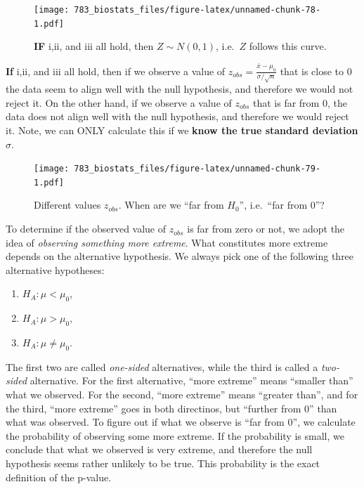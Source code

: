 \documentclass[]{book}
\providecommand{\tightlist}{%
  \setlength{\itemsep}{0pt}\setlength{\parskip}{0pt}}
\theoremstyle{definition}
\theoremstyle{definition}
\theoremstyle{definition}
\theoremstyle{remark}
\begin{document}
\begin{figure}
\centering
\texttt{[image: 783\_biostats\_files/figure-latex/unnamed-chunk-78-1.pdf]}
\caption{\label{fig:unnamed-chunk-78}\textbf{IF} i,ii, and iii all hold, then \(Z \sim N(0,1)\), i.e.~\(Z\) follows this curve.}
\end{figure}

\textbf{If} i,ii, and iii all hold, then if we observe a value of \(z_{obs} = \frac{\bar{x} - \mu_0}{\sigma/\sqrt{n}}\) that is close to \(0\) the data seem to align well with the null hypothesis, and therefore we would not reject it. On the other hand, if we observe a value of \(z_{obs}\) that is far from \(0\), the data does not align well with the null hypothesis, and therefore we would reject it. Note, we can ONLY calculate this if we \textbf{know the true standard deviation \(\sigma\)}.

\begin{figure}
\centering
\texttt{[image: 783\_biostats\_files/figure-latex/unnamed-chunk-79-1.pdf]}
\caption{\label{fig:unnamed-chunk-79}Different values \(z_{obs}\). When are we ``far from \(H_0\)'', i.e.~``far from \(0\)''?}
\end{figure}

To determine if the observed value of \(z_{obs}\) is far from zero or not, we adopt the idea of \emph{observing something more extreme}. What constitutes more extreme depends on the alternative hypothesis. We always pick one of the following three alternative hypotheses:

\begin{enumerate}
\def\labelenumi{\arabic{enumi}.}
\tightlist
\item
  \(H_A: \mu < \mu_0\),
\item
  \(H_A: \mu > \mu_0\),
\item
  \(H_A: \mu \neq \mu_0\).
\end{enumerate}

The first two are called \emph{one-sided} alternatives, while the third is called a \emph{two-sided} alternative. For the first alternative, ``more extreme'' means ``smaller than'' what we observed. For the second, ``more extreme'' means ``greater than'', and for the third, ``more extreme'' goes in both directinos, but ``further from \(0\)'' than what was observed. To figure out if what we observe is ``far from \(0\)'', we calculate the probability of observing some more extreme. If the probability is small, we conclude that what we observed is very extreme, and therefore the null hypothesis seems rather unlikely to be true. This probability is the exact definition of the p-value.
\end{document}
